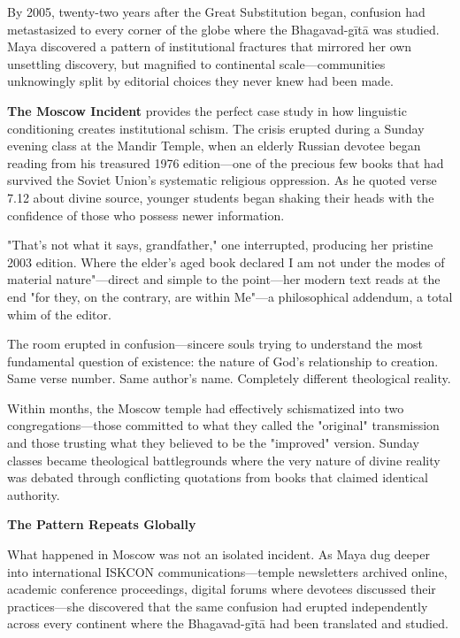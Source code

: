 \documentclass[12pt,twoside]{book}
\begin{document}
By 2005, twenty-two years after the Great Substitution began, confusion had metastasized to every corner of the globe where the Bhagavad-gītā was studied. Maya discovered a pattern of institutional fractures that mirrored her own unsettling discovery, but magnified to continental scale—communities unknowingly split by editorial choices they never knew had been made.

\textbf{\textbf{The Moscow Incident}} provides the perfect case study in how linguistic conditioning creates institutional schism. The crisis erupted during a Sunday evening class at the Mandir Temple, when an elderly Russian devotee began reading from his treasured 1976 edition—one of the precious few books that had survived the Soviet Union's systematic religious oppression. As he quoted verse 7.12 about divine source, younger students began shaking their heads with the confidence of those who possess newer information.

"That's not what it says, grandfather," one interrupted, producing her pristine 2003 edition. Where the elder's aged book declared I am not under the modes of material nature"—direct and simple to the point—her modern text reads at the end "for they, on the contrary, are within Me"—a philosophical addendum, a total whim of the editor.

The room erupted in confusion—sincere souls trying to understand the most fundamental question of existence: the nature of God's relationship to creation. Same verse number. Same author's name. Completely different theological reality.

Within months, the Moscow temple had effectively schismatized into two congregations—those committed to what they called the "original" transmission and those trusting what they believed to be the "improved" version. Sunday classes became theological battlegrounds where the very nature of divine reality was debated through conflicting quotations from books that claimed identical authority.


\vspace{0.5cm}
\textbf{The Pattern Repeats Globally}
\vspace{0.2cm}


What happened in Moscow was not an isolated incident. As Maya dug deeper into international ISKCON communications—temple newsletters archived online, academic conference proceedings, digital forums where devotees discussed their practices—she discovered that the same confusion had erupted independently across every continent where the Bhagavad-gītā had been translated and studied.
\end{document}
